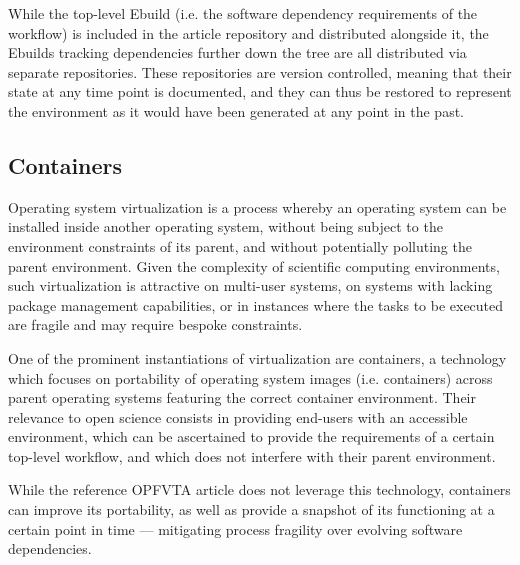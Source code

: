 While the top-level Ebuild (i.e. the software dependency requirements of the workflow) is included in the article repository and distributed alongside it, the Ebuilds tracking dependencies further down the tree are all distributed via separate repositories.
These repositories are version controlled, meaning that their state at any time point is documented, and they can thus be restored to represent the environment as it would have been generated at any point in the past.


\subsection{Containers}

Operating system virtualization is a process whereby an operating system can be installed inside another operating system, without being subject to the environment constraints of its parent, and without potentially polluting the parent environment.
Given the complexity of scientific computing environments, such virtualization is attractive on multi-user systems, on systems with lacking package management capabilities, or in instances where the tasks to be executed are fragile and may require bespoke constraints.

One of the prominent instantiations of virtualization are containers, a technology which focuses on portability of operating system images (i.e. containers) across parent operating systems featuring the correct container environment.
Their relevance to open science consists in providing end-users with an accessible environment, which can be ascertained to provide the requirements of a certain top-level workflow, and which does not interfere with their parent environment.

While the reference OPFVTA article does not leverage this technology, containers can improve its portability, as well as provide a snapshot of its functioning at a certain point in time — mitigating process fragility over evolving software dependencies.

